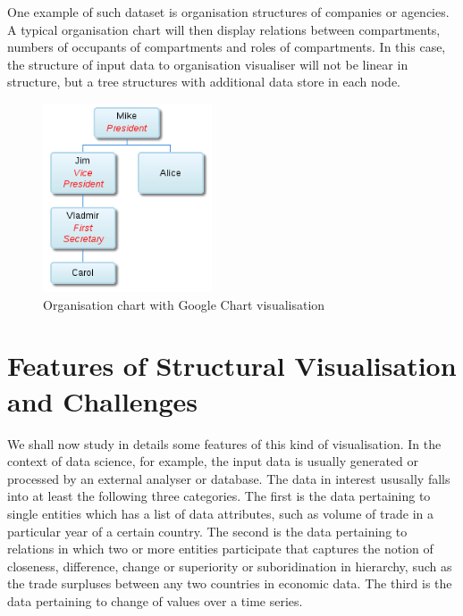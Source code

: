 \documentclass[11pt, a4paper]{report}
\begin{document}
One example of such dataset is organisation structures of companies or agencies. A typical organisation chart will then display relations between compartments, numbers of occupants of compartments and roles of compartments. In this case, the structure of input data to organisation visualiser will not be linear in structure, but a tree structures with additional data store in each node.
\begin{figure}[H]
\centering
\includegraphics[width=5cm]{fig1_org_chart}
\caption{Organisation chart with Google Chart visualisation}
\label{fig:org_chart}
\end{figure}

\section{Features of Structural Visualisation and Challenges}

We shall now study in details some features of this kind of visualisation. In the context of data science, for example, the input data is usually generated or processed by an external analyser or database. The data in interest ususally falls into at least the following three categories. The first is the data pertaining to single entities which has a list of data attributes, such as volume of trade in a particular year of a certain country. The second is the data pertaining to relations in which two or more entities participate that captures the notion of closeness, difference, change or superiority or suboridination in hierarchy, such as the trade surpluses between any two countries in economic data. The third is the data pertaining to change of values over a time series.
\end{document}
